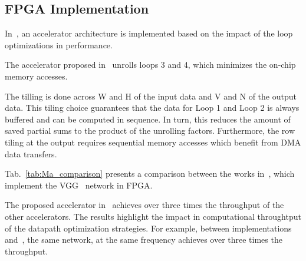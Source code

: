 \subsection{FPGA Implementation}
\label{sec:proposed_accelerator}
In~\cite{Ma:80_OptDataflow_in_CNN}, an accelerator architecture is implemented based on the impact of the loop optimizations in performance.

The accelerator proposed in~\cite{Ma:80_OptDataflow_in_CNN} unrolls loops 3 and 4, which minimizes the
on-chip memory accesses.

The tilling is done across W and H of the input data and V and N of the output
data. This tiling choice guarantees that the data for Loop 1 and Loop 2 is
always buffered and can be computed in sequence. In turn, this reduces the
amount of saved partial sums to the product of the unrolling
factors. Furthermore, the row tiling at the output requires sequential memory
accesses which benefit from DMA data transfers.

Tab.~\ref{tab:Ma_comparison} presents a comparison between the works
in~\cite{Ma_comp_ref10, Ma_comp_ref9, Ma_comp_ref8, Ma:80_OptDataflow_in_CNN},
which implement the VGG~\cite{VGG} network in FPGA.

The proposed accelerator in~\cite{Ma:80_OptDataflow_in_CNN} achieves over three
times the throughput of the other accelerators. The results highlight the impact in
computational throughtput of the datapath optimization strategies. For example, between implementations~\cite{Ma_comp_ref8} and~\cite{Ma:80_OptDataflow_in_CNN}, 
the same network, at the same frequency achieves over three times the throughput.


